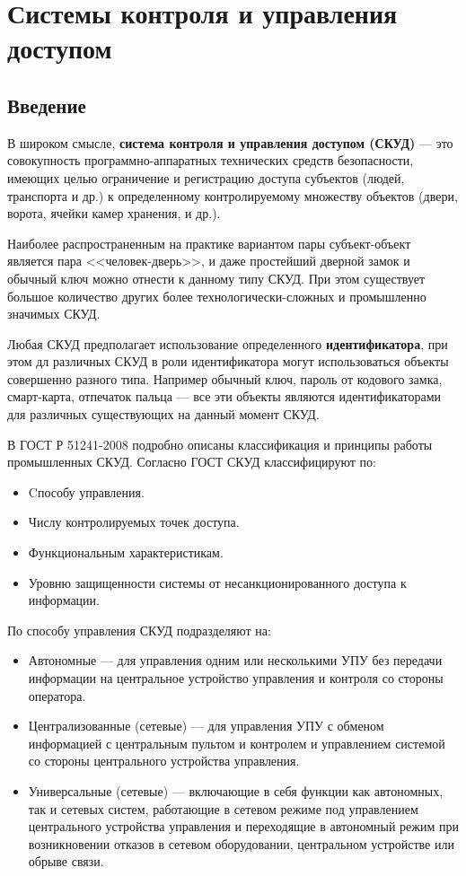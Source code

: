 \chapter{Системы контроля и управления доступом} \label{chapt1}

\section{Введение} \label{sect1_1}

В широком смысле, \textbf{система контроля и управления доступом (СКУД)} — это совокупность программно-аппаратных технических средств безопасности, имеющих целью ограничение и регистрацию доступа субъектов (людей, транспорта и др.) к определенному контролируемому множеству объектов (двери, ворота, ячейки камер хранения, и др.). 

Наиболее распространенным на практике вариантом пары субъект-объект является пара <<человек-дверь>>, и даже простейший дверной замок и обычный ключ можно отнести к данному типу СКУД. При этом существует большое количество других более технологически-сложных и промышленно значимых СКУД.

Любая СКУД предполагает использование определенного \textbf{идентификатора}, при этом дл различных СКУД в роли идентификатора могут использоваться объекты совершенно разного типа. Например обычный ключ, пароль от кодового замка, смарт-карта, отпечаток пальца — все эти объекты являются идентификаторами для различных существующих на данный момент СКУД.


В ГОСТ Р 51241-2008 подробно описаны классификация и принципы работы промышленных СКУД. Согласно ГОСТ СКУД классифицируют по:
\begin{itemize}
  \item Cпособу управления.
  \item Числу контролируемых точек доступа.
  \item Функциональным характеристикам.
  \item Уровню защищенности системы от несанкционированного доступа к информации.
\end{itemize}

По способу управления СКУД подразделяют на:
\begin{itemize}
  \item Автономные — для управления одним или несколькими УПУ без передачи информации на центральное устройство управления и контроля со стороны оператора.
  \item Централизованные (сетевые) — для управления УПУ с обменом информацией с центральным пультом и контролем и управлением системой со стороны центрального устройства управления.
  \item Универсальные (сетевые) — включающие в себя функции как автономных, так и сетевых систем, работающие в сетевом режиме под управлением центрального устройства управления и переходящие в автономный режим при возникновении отказов в сетевом оборудовании, центральном устройстве или обрыве связи.
\end{itemize}

